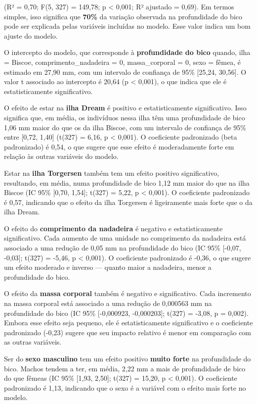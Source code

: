 \documentclass[
  letterpaper,
  DIV=11,
  numbers=noendperiod]{scrartcl}
\begin{document}
(R² = 0,70; F(5, 327) = 149,78; p \textless{} 0,001; R² ajustado =
0,69). Em termos simples, isso significa que \textbf{70\%} da variação
observada na profundidade do bico pode ser explicada pelas variáveis
incluídas no modelo. Esse valor indica um bom ajuste do modelo.

O intercepto do modelo, que corresponde à \textbf{profundidade do bico}
quando, ilha = Biscoe, comprimento\_nadadeira = 0, massa\_corporal = 0,
sexo = fêmea, é estimado em 27,90 mm, com um intervalo de confiança de
95\% {[}25,24, 30,56{]}. O valor t associado ao intercepto é 20,64 (p
\textless{} 0,001), o que indica que ele é estatisticamente
significativo.

O efeito de estar na \textbf{ilha Dream} é positivo e estatisticamente
significativo. Isso significa que, em média, os indivíduos nessa ilha
têm uma profundidade de bico 1,06 mm maior do que os da ilha Biscoe, com
um intervalo de confiança de 95\% entre {[}0,72, 1,40{]} (t(327) = 6,16,
p \textless{} 0,001). O coeficiente padronizado (beta padronizado) é
0,54, o que sugere que esse efeito é moderadamente forte em relação às
outras variáveis do modelo.

Estar na \textbf{ilha Torgersen} também tem um efeito positivo
significativo, resultando, em média, numa profundidade de bico 1,12 mm
maior do que na ilha Biscoe (IC 95\% {[}0,70, 1,54{]}; t(327) = 5,22, p
\textless{} 0,001). O coeficiente padronizado é 0,57, indicando que o
efeito da ilha Torgersen é ligeiramente mais forte que o da ilha Dream.

O efeito do \textbf{comprimento da nadadeira} é negativo e
estatisticamente significativo. Cada aumento de uma unidade no
comprimento da nadadeira está associado a uma redução de 0,05 mm na
profundidade do bico (IC 95\% {[}-0,07, -0,03{]}; t(327) = -5,46, p
\textless{} 0,001). O coeficiente padronizado é -0,36, o que sugere um
efeito moderado e inverso --- quanto maior a nadadeira, menor a
profundidade do bico.

O efeito da \textbf{massa corporal} também é negativo e significativo.
Cada incremento na massa corporal está associado a uma redução de
0,000563 mm na profundidade do bico (IC 95\% {[}-0,000923, -0,000203{]};
t(327) = -3,08, p = 0,002). Embora esse efeito seja pequeno, ele é
estatisticamente significativo e o coeficiente padronizado (-0,23)
sugere que seu impacto relativo é menor em comparação com as outras
variáveis.

Ser do \textbf{sexo masculino} tem um efeito positivo \textbf{muito
forte} na profundidade do bico. Machos tendem a ter, em média, 2,22 mm a
mais de profundidade de bico do que fêmeas (IC 95\% {[}1,93, 2,50{]};
t(327) = 15,20, p \textless{} 0,001). O coeficiente padronizado é 1,13,
indicando que o sexo é a variável com o efeito mais forte no modelo.
\end{document}
